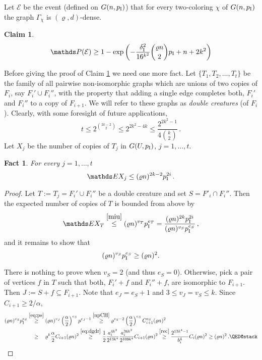 \documentclass[reqno, 12pt]{amsart}
\newcommand{\PP}{\mathds{P}}
\newtheorem{fact}[theorem]{Fact}
\newtheorem{claim}[theorem]{Claim}
\let\rho=\varrho
\def\PP{\mathds P}
\def\EE{\mathds E}
\begin{document}
Let $\mathcal{E}$ be the event (defined on $G(n,p_{\rm I})$) that  for every  two-coloring $\chi$
of $G(n,p_{\rm I})$ the graph $\Gamma_\chi$ is $(\rho,d)$-dense.


\begin{claim}\label{Gamma}
$$
 \PP(\mathcal{E})\ge1-\exp\left(-\frac{\delta_{\rm I}^2}{16^{k^2}}\binom{\rho n}{2}p_{\rm I}+n+2k^2\right)
$$
\end{claim}

Before giving the proof of Claim \ref{Gamma} we need one more fact.
 Let $\{T_1,T_2,\dots,T_t\}$ be the family of all pairwise
non-isomorphic graphs which are unions of two copies of $F_i$, say $F_i'\cup F_i''$, with the property that adding a single edge completes both, $F_i'$ and $F_i''$
to a copy of $F_{i+1}$. We will refer to these graphs  as \emph{double creatures} (of $F_i$).
Clearly, with some foresight of future applications,
\begin{equation}\label{eq:t}
    t\leq 2^{\binom{2k-2}{2}}\le2^{2k^2-4k}\le\frac{2^{2k^2-1}}{4\binom k2}\,.
\end{equation}
Let $X_j$ be the number of copies of $T_j$ in $G(U,p_{\rm I})$, $j=1,\dots,t$.
\begin{fact}\label{T}
For every $j=1,\dots,t$
$$\EE X_j\le(\rho n)^{2k-2}p_{\rm I}^{2i}\,.$$
\end{fact}
\begin{proof}
Let $T:=T_j=F_i'\cup F_i''$ be a double creature and set $S=F'_i\cap F_i''$. Then the expected number of
copies of $T$ is bounded from above  by
\[
    \EE X_T\overset{\eqref{miu}}{\leq} (\rho n)^{v_T}p_{\rm I}^{e_T}=\frac{(\rho n)^{2k}p_{\rm I}^{2i}}
    {(\rho n)^{v_S}p_{\rm I}^{e_S}}\,,
\]
and it remains to show that
$$
(\rho n)^{v_S}p_{\rm I}^{e_{S}}\ge (\rho n)^{2}.
$$

 There is nothing to prove when $v_S=2$ (and thus $e_S=0$).
 Otherwise, pick a pair of vertices $f$ in $T$ such that both,
$F_i'+f$ and $F_i''+f$, are isomorphic to $F_{i+1}$. Then $J:=S+f\subseteq F_{i+1}$. Note that
$e_J=e_S+1$ and  $3\le v_J=v_S\le k$. Since $C_{i+1}\ge2/\alpha$,
\begin{align*}
    (\rho n)^{v_S}p_{\rm I}^{e_{S}}
    &\overset{\eqref{eq:ps}}{\ge}
    (\rho n)^{v_J}\left(\frac{\alpha}{2}\right)^{e_S}p^{e_{J}-1}
    \overset{\eqref{npCH}}{\geq}
    \rho^{v_S-2}\left(\frac{\alpha}{2}\right)^{e_S}C_{i+1}^{e_{S}}(\rho n)^2\\
    &\overset{\phantom{\eqref{eq:ps}}}{\ge}\rho^k\frac\alpha2 C_{i+1}(\rho n)^2
    \overset{\eqref{eq:dgdr}}{\geq}
    \frac12\frac{a_i^{4k^2}}{2^{13k^4}}
    \frac{a_i^{36k^2}}{2^{109k^4}} C_{i+1}(\rho n)^2
    \overset{\eqref{rec}}{\geq}
    \frac{2^{13k^4-1}}{b_i^{4}}C_i(\rho n)^2\ge (\rho n)^2
    \,.\qedhere
\end{align*}
\end{proof}
\end{document}
